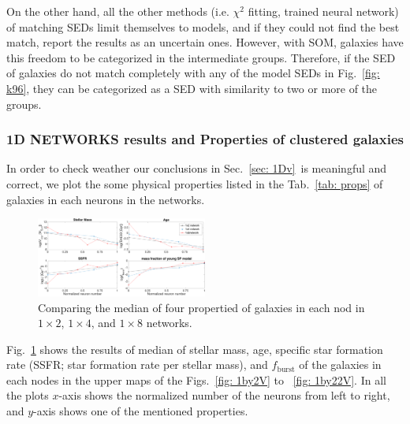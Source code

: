             On the other hand, all the other methods (i.e. $\chi^2$ fitting, trained neural network) of matching SEDs limit themselves to models, and if they could not find the best match, report the results as an uncertain ones.
            However, with SOM, galaxies have this freedom to be categorized in the intermediate groups.
            Therefore, if the SED of galaxies do not match completely with any of the model SEDs in Fig.~\ref{fig: k96}, they can be categorized as a SED with similarity to two or more of the groups.

                        
        
        
        \subsubsection{1D NETWORKS results and Properties of clustered galaxies}
        
        In order to check weather our conclusions in Sec.~\ref{sec: 1Dv}~is meaningful and correct, we plot the some physical properties listed in the Tab.~\ref{tab: props} of galaxies in each neurons in the networks.
        
        \begin{figure}
            \centering
            \includegraphics[width=0.5\textwidth]{../images0.01/1d/props4.png}
            \caption{Comparing the median of four propertied of galaxies in each nod in $1\times2$, $1\times4$, and $1\times8$ networks.}
            \label{fig: props}
        \end{figure}
       
        Fig.~\ref{fig: props} shows the results of median of stellar mass, age, specific star formation rate (SSFR; star formation rate per stellar mass), and $f_\mathrm{burst}$ of the galaxies in each nodes in the upper maps of the Figs.~\ref{fig: 1by2V} to ~\ref{fig: 1by22V}.
        In all the plots $x$-axis shows the normalized number of the neurons from left to right, and $y$-axis shows one of the mentioned properties.
        
